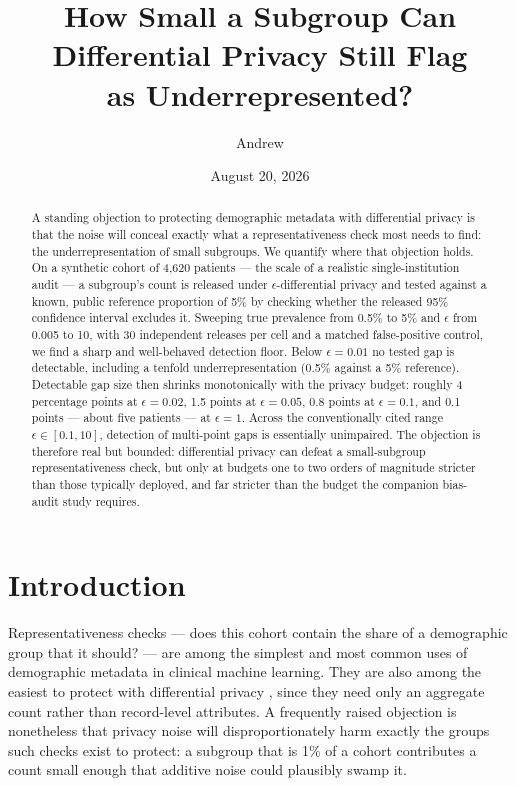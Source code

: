 \documentclass[11pt]{article}
\title{How Small a Subgroup Can Differential Privacy Still Flag\\ as Underrepresented?}
\author{Andrew}
\date{August 20, 2026}
\begin{document}
\maketitle

\begin{abstract}
\noindent A standing objection to protecting demographic metadata with differential privacy is that the noise will conceal exactly what a representativeness check most needs to find: the underrepresentation of small subgroups. We quantify where that objection holds. On a synthetic cohort of 4,620 patients --- the scale of a realistic single-institution audit --- a subgroup's count is released under $\epsilon$-differential privacy and tested against a known, public reference proportion of 5\% by checking whether the released 95\% confidence interval excludes it. Sweeping true prevalence from 0.5\% to 5\% and $\epsilon$ from 0.005 to 10, with 30 independent releases per cell and a matched false-positive control, we find a sharp and well-behaved detection floor. Below $\epsilon = 0.01$ no tested gap is detectable, including a tenfold underrepresentation (0.5\% against a 5\% reference). Detectable gap size then shrinks monotonically with the privacy budget: roughly 4 percentage points at $\epsilon = 0.02$, 1.5 points at $\epsilon = 0.05$, 0.8 points at $\epsilon = 0.1$, and 0.1 points --- about five patients --- at $\epsilon = 1$. Across the conventionally cited range $\epsilon \in [0.1, 10]$, detection of multi-point gaps is essentially unimpaired. The objection is therefore real but bounded: differential privacy can defeat a small-subgroup representativeness check, but only at budgets one to two orders of magnitude stricter than those typically deployed, and far stricter than the budget the companion bias-audit study requires.
\end{abstract}

\section{Introduction}

Representativeness checks --- does this cohort contain the share of a demographic group that it should? --- are among the simplest and most common uses of demographic metadata in clinical machine learning. They are also among the easiest to protect with differential privacy \cite{dwork2006, dwork2014}, since they need only an aggregate count rather than record-level attributes. A frequently raised objection is nonetheless that privacy noise will disproportionately harm exactly the groups such checks exist to protect: a subgroup that is 1\% of a cohort contributes a count small enough that additive noise could plausibly swamp it.
\end{document}
